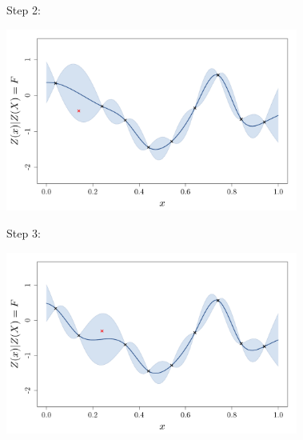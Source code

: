 \begin{frame}{}
Step 2:\\ \vspace{3mm}
\begin{center}
\includegraphics[height=6cm]{3_gaussian_process_regression/figures/R/VALID_crossval2}
\end{center}
\end{frame}

\begin{frame}{}
Step 3:\\ \vspace{3mm}
\begin{center}
\includegraphics[height=6cm]{3_gaussian_process_regression/figures/R/VALID_crossval3}
\end{center}
\end{frame}

